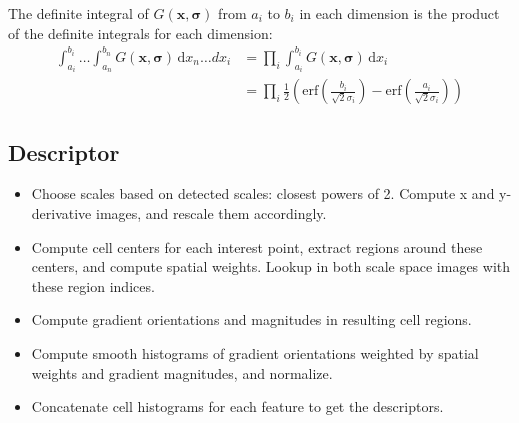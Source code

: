 \documentclass[../thesis.tex]{subfiles}
\begin{document}
%
The definite integral of $G(\mathbf{x},\boldsymbol{\sigma})$ from $a_i$ to $b_i$ in each dimension is the product of the definite integrals for each dimension:
%
\begin{align}
\int_{a_i}^{b_i} \dots \int_{a_n}^{b_n} G(\mathbf{x},\boldsymbol{\sigma}) \,\mathrm d{x_n} \dots d{x_i}
&= \prod_i \int_{a_i}^{b_i} G(\mathbf{x},\boldsymbol{\sigma}) \,\mathrm d{x_i} \\
&= \prod_i \frac{1}{2} \left(
\mathrm{erf} \left( \frac{b_i}{\sqrt{2} \sigma_i} \right) -
\mathrm{erf} \left( \frac{a_i}{\sqrt{2} \sigma_i} \right)
\right)
\end{align}
%
\subsection{Descriptor}
%
\begin{itemize}
\item Choose scales based on detected scales: closest powers of 2. Compute x and y-derivative images, and rescale them accordingly.
\item Compute cell centers for each interest point, extract regions around these centers, and compute spatial weights. Lookup in both scale space images with these region indices.
\item Compute gradient orientations and magnitudes in resulting cell regions.
\item Compute smooth histograms of gradient orientations weighted by spatial weights and gradient magnitudes, and normalize.
\item Concatenate cell histograms for each feature to get the descriptors.
\end{itemize}
%
%
%
%
%
%
%
%
%

\subbibliography
\end{document}
